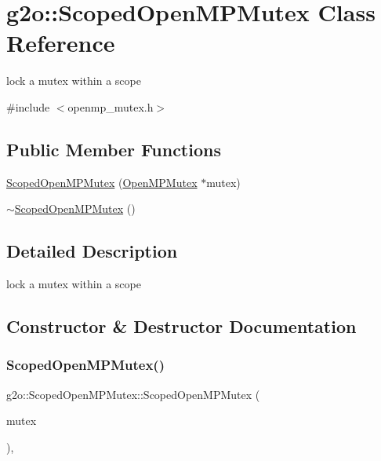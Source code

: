 \hypertarget{classg2o_1_1_scoped_open_m_p_mutex}{}\section{g2o\+:\+:Scoped\+Open\+M\+P\+Mutex Class Reference}
\label{classg2o_1_1_scoped_open_m_p_mutex}


lock a mutex within a scope  




{\ttfamily \#include $<$openmp\+\_\+mutex.\+h$>$}

\subsection*{Public Member Functions}
\begin{DoxyCompactItemize}
\item 
\mbox{\hyperlink{classg2o_1_1_scoped_open_m_p_mutex_abb18bffae04b138447870b58ab158f56}{Scoped\+Open\+M\+P\+Mutex}} (\mbox{\hyperlink{classg2o_1_1_open_m_p_mutex}{Open\+M\+P\+Mutex}} $\ast$mutex)
\item 
\mbox{\hyperlink{classg2o_1_1_scoped_open_m_p_mutex_af3c190c5fba832ce48db9edf6ea10552}{$\sim$\+Scoped\+Open\+M\+P\+Mutex}} ()
\end{DoxyCompactItemize}


\subsection{Detailed Description}
lock a mutex within a scope 

\subsection{Constructor \& Destructor Documentation}
\mbox{\label{classg2o_1_1_scoped_open_m_p_mutex_abb18bffae04b138447870b58ab158f56}} 
\subsubsection{\texorpdfstring{Scoped\+Open\+M\+P\+Mutex()}{ScopedOpenMPMutex()}}
{\footnotesize\ttfamily g2o\+::\+Scoped\+Open\+M\+P\+Mutex\+::\+Scoped\+Open\+M\+P\+Mutex (\begin{DoxyParamCaption}\item[{\mbox{\hyperlink{classg2o_1_1_open_m_p_mutex}{Open\+M\+P\+Mutex}} $\ast$}]{mutex }\end{DoxyParamCaption})\hspace{0.3cm}{\ttfamily [inline]}, {\ttfamily [explicit]}}

